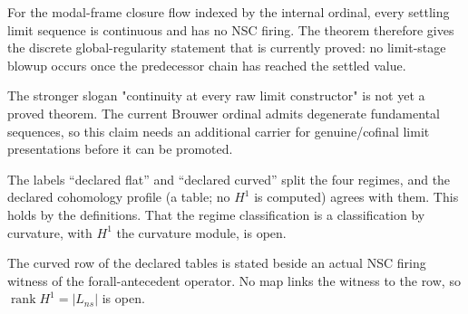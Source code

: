 \begin{theorem}\label{thm:transfinite-closure-flow-no-blowup}\leanok{}
For the modal-frame closure flow indexed by the internal ordinal, every
settling limit sequence is continuous and has no NSC firing.  The theorem
therefore gives the discrete global-regularity statement that is currently
proved: no limit-stage blowup occurs once the predecessor chain has reached the
settled value.
\end{theorem}

\begin{theorem}\label{thm:raw-all-limit-regularity-frontier}\notready{}
The stronger slogan "continuity at every raw limit constructor" is not yet a
proved theorem.  The current Brouwer ordinal admits degenerate fundamental sequences,
so this claim needs an additional carrier for genuine/cofinal limit
presentations before it can be promoted.
\end{theorem}

\begin{theorem}\label{thm:curvature-regime-correspondence}\leanok{}
The labels ``declared flat'' and ``declared curved'' split the four regimes, and the
declared cohomology profile (a table; no \(H^1\) is computed) agrees with them.  This holds
by the definitions.  That the regime classification is a classification by curvature, with
\(H^1\) the curvature module, is open.
\end{theorem}

\begin{theorem}\label{thm:curvature-rank-has-nsc-firing}\leanok{}
The curved row of the declared tables is stated beside an actual NSC firing witness of the
forall-antecedent operator.  No map links the witness to the row, so
\(\operatorname{rank} H^1 = |L_{ns}|\) is open.
\end{theorem}
